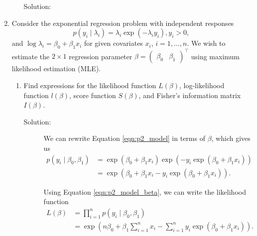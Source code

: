 \documentclass[letterpaper,11pt]{article}
\begin{document}
\begin{enumerate}
\begin{enumerate}
    \begin{description}
    \item[Solution:] 
    \end{description}
  \end{enumerate}
\item Consider the exponential regression problem with independent responses
  \begin{equation}
    p\left(y_i \mid \lambda_i\right) = \lambda_i\exp\left(-\lambda_iy_i\right),
    y_i > 0,
    \label{eqn:p2_model}
  \end{equation}
  and $\log\lambda_i = \beta_0 + \beta_1x_i$ for given covariates $x_i$,
  $i = 1,\ldots,n$. We wish to estimate the $2 \times 1$ regression parameter
  $\beta = \begin{pmatrix}
    \beta_0 & \beta_1
  \end{pmatrix}^\intercal$ using maximum likelihood estimation (MLE).

  \begin{enumerate}
  \item Find expressions for the likelihood function $L\left(\beta\right)$,
    log-likelihood function $l\left(\beta\right)$, score function
    $S\left(\beta\right)$, and Fisher's information matrix $I\left(\beta\right)$.

    \begin{description}
    \item[Solution:] We can rewrite Equation \ref{eqn:p2_model} in terms of
      $\beta$, which gives us
      \begin{align}
        p\left(y_i \mid \beta_0,\beta_1\right)
        &= \exp\left(\beta_0 + \beta_1x_i\right)
        \exp\left(- y_i\exp\left(\beta_0 + \beta_1x_i\right)\right) \nonumber\\
        &=
        \exp\left(
          \beta_0 + \beta_1x_i - y_i\exp\left(\beta_0 + \beta_1x_i\right)\right)
        \label{eqn:p2_model_beta}.
      \end{align}

      Using Equation \ref{eqn:p2_model_beta}, we can write the likelihood
      function
      \begin{align}
        L\left(\beta\right)
        &= \prod_{i=1}^n p\left(y_i \mid \beta_0,\beta_1\right) \nonumber\\
        &= \exp\left(
          n\beta_0 + \beta_1\sum_{i=1}^n x_i
          -
          \sum_{i=1}^n y_i\exp\left(\beta_0 + \beta_1x_i\right)
          \right).
          \label{eqn:p2_likelihood}
      \end{align}


\end{description}
\end{enumerate}
\end{enumerate}
\end{document}
